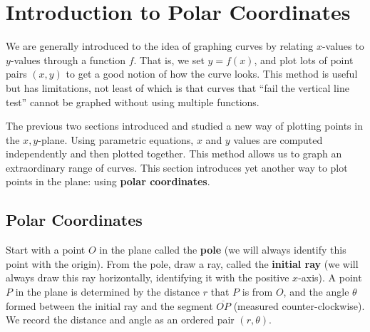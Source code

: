 \section{Introduction to Polar Coordinates}\label{sec:polar}

We are generally introduced to the idea of graphing curves by relating $x$-values to $y$-values through a function $f$. That is, we set $y=f(x)$, and plot lots of point pairs $(x,y)$ to get a good notion of how the curve looks. This method is useful but has limitations, not least of which is that curves that ``fail the vertical line test'' cannot be graphed without using multiple functions.

The previous two sections introduced and studied a new way of plotting points in the $x,y$-plane. Using parametric equations, $x$ and $y$ values are computed independently and then plotted together. This method allows us to graph an extraordinary range of curves. This section introduces yet another way to plot points in the plane: using \textbf{polar coordinates}.

\subsection*{Polar Coordinates}


Start with a point $O$ in the plane called the \textbf{pole} (we will always identify this point with the origin). From the pole, draw a ray, called the \textbf{initial ray} (we will always draw this ray horizontally, identifying it with the positive $x$-axis). A point $P$ in the plane is determined by the distance $r$ that $P$ is from $O$, and the angle $\theta$ formed between the initial ray and the segment $\overline{OP}$ (measured counter-clockwise). We record the distance and angle as an ordered pair $(r,\theta)$. %

